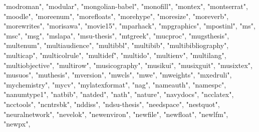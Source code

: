 \documentclass[
]{article}
\newenvironment{Shaded}{\begin{snugshade}}{\end{snugshade}}
\newcommand{\NormalTok}[1]{#1}
\newcommand{\StringTok}[1]{\textcolor[rgb]{0.31,0.60,0.02}{#1}}
\begin{document}
\begin{Shaded}
\begin{Highlighting}[]
\StringTok{"modroman"}\NormalTok{, }\StringTok{"modular"}\NormalTok{, }\StringTok{"mongolian{-}babel"}\NormalTok{, }\StringTok{"monofill"}\NormalTok{, }\StringTok{"montex"}\NormalTok{, }
\StringTok{"montserrat"}\NormalTok{, }\StringTok{"moodle"}\NormalTok{, }\StringTok{"moreenum"}\NormalTok{, }\StringTok{"morefloats"}\NormalTok{, }\StringTok{"morehype"}\NormalTok{, }
\StringTok{"moresize"}\NormalTok{, }\StringTok{"moreverb"}\NormalTok{, }\StringTok{"morewrites"}\NormalTok{, }\StringTok{"morisawa"}\NormalTok{, }\StringTok{"movie15"}\NormalTok{, }
\StringTok{"mparhack"}\NormalTok{, }\StringTok{"mpgraphics"}\NormalTok{, }\StringTok{"mpostinl"}\NormalTok{, }\StringTok{"ms"}\NormalTok{, }\StringTok{"msc"}\NormalTok{, }\StringTok{"msg"}\NormalTok{, }\StringTok{"mslapa"}\NormalTok{, }
\StringTok{"msu{-}thesis"}\NormalTok{, }\StringTok{"mtgreek"}\NormalTok{, }\StringTok{"mucproc"}\NormalTok{, }\StringTok{"mugsthesis"}\NormalTok{, }\StringTok{"multenum"}\NormalTok{, }
\StringTok{"multiaudience"}\NormalTok{, }\StringTok{"multibbl"}\NormalTok{, }\StringTok{"multibib"}\NormalTok{, }\StringTok{"multibibliography"}\NormalTok{, }
\StringTok{"multicap"}\NormalTok{, }\StringTok{"multicolrule"}\NormalTok{, }\StringTok{"multidef"}\NormalTok{, }\StringTok{"multido"}\NormalTok{, }\StringTok{"multienv"}\NormalTok{, }
\StringTok{"multilang"}\NormalTok{, }\StringTok{"multiobjective"}\NormalTok{, }\StringTok{"multirow"}\NormalTok{, }\StringTok{"musicography"}\NormalTok{, }\StringTok{"musikui"}\NormalTok{, }
\StringTok{"musixguit"}\NormalTok{, }\StringTok{"musixtex"}\NormalTok{, }\StringTok{"musuos"}\NormalTok{, }\StringTok{"muthesis"}\NormalTok{, }\StringTok{"mversion"}\NormalTok{, }\StringTok{"mwcls"}\NormalTok{, }
\StringTok{"mwe"}\NormalTok{, }\StringTok{"mweights"}\NormalTok{, }\StringTok{"mxedruli"}\NormalTok{, }\StringTok{"mychemistry"}\NormalTok{, }\StringTok{"mycv"}\NormalTok{, }\StringTok{"mylatexformat"}\NormalTok{, }
\StringTok{"nag"}\NormalTok{, }\StringTok{"nameauth"}\NormalTok{, }\StringTok{"namespc"}\NormalTok{, }\StringTok{"nanumtype1"}\NormalTok{, }\StringTok{"natbib"}\NormalTok{, }\StringTok{"natded"}\NormalTok{, }
\StringTok{"nath"}\NormalTok{, }\StringTok{"nature"}\NormalTok{, }\StringTok{"navydocs"}\NormalTok{, }\StringTok{"ncclatex"}\NormalTok{, }\StringTok{"ncctools"}\NormalTok{, }\StringTok{"ncntrsbk"}\NormalTok{, }
\StringTok{"nddiss"}\NormalTok{, }\StringTok{"ndsu{-}thesis"}\NormalTok{, }\StringTok{"needspace"}\NormalTok{, }\StringTok{"nestquot"}\NormalTok{, }\StringTok{"neuralnetwork"}\NormalTok{, }
\StringTok{"nevelok"}\NormalTok{, }\StringTok{"newenviron"}\NormalTok{, }\StringTok{"newfile"}\NormalTok{, }\StringTok{"newfloat"}\NormalTok{, }\StringTok{"newlfm"}\NormalTok{, }\StringTok{"newpx"}\NormalTok{, }

\end{Highlighting}
\end{Shaded}
\end{document}

